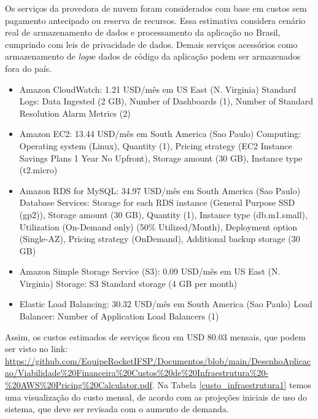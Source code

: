 \documentclass[
    12pt,               %
    openright,          %
    oneside,
    a4paper,            %
    BIBLATEX,           %
    TODO,               %
    english,            %
    brazil              %
    ]{ifsp-spo-inf-ctds}
\begin{document}
            Os serviços da provedora de nuvem foram considerados com base em custos sem pagamento antecipado ou reserva de recursos. Essa estimativa considera cenário real de armazenamento de dados e processamento da aplicação no Brasil, cumprindo com leis de privacidade de dados. Demais serviços acessórios como armazenamento de \emph{logs}e dados de código da aplicação podem ser armazenados fora do país.

            \begin{itemize}

                \item Amazon CloudWatch: 1.21 USD/mês em US East (N. Virginia) Standard Logs: Data Ingested (2 GB), Number of Dashboards (1), Number of Standard Resolution Alarm Metrics (2)

                \item Amazon EC2: 13.44 USD/mês em South America (Sao Paulo) Computing: Operating system (Linux), Quantity (1), Pricing strategy (EC2 Instance Savings Plans 1 Year No Upfront), Storage amount (30 GB), Instance type (t2.micro)

                \item Amazon RDS for MySQL: 34.97 USD/mês em South America (Sao Paulo) Database Services: Storage for each RDS instance (General Purpose SSD (gp2)), Storage amount (30 GB), Quantity (1), Instance type (db.m1.small), Utilization (On-Demand only) (50\% Utilized/Month), Deployment option (Single-AZ), Pricing strategy (OnDemand), Additional backup storage (30 GB)

                \item Amazon Simple Storage Service (S3): 0.09 USD/mês em US East (N. Virginia) Storage: S3 Standard storage (4 GB per month)

                \item Elastic Load Balancing: 30.32 USD/mês em South America (Sao Paulo) Load Balancer: Number of Application Load Balancers (1)

            \end{itemize}  


            Assim, os custos estimados de serviços ficou em USD 80.03 mensais, que podem ser visto no link: \url{https://github.com/EquipeRocketIFSP/Documentos/blob/main/DesenhoAplicacao/Viabilidade\%20Financeira\%20Custos\%20de\%20Infraestrutura\%20-\%20AWS\%20Pricing\%20Calculator.pdf}. Na Tabela \ref{custo_infraestrutura1} temos uma visualização do custo mensal, de acordo com as projeções iniciais de uso do sistema, que deve ser revisada com o aumento de demanda.
\end{document}
